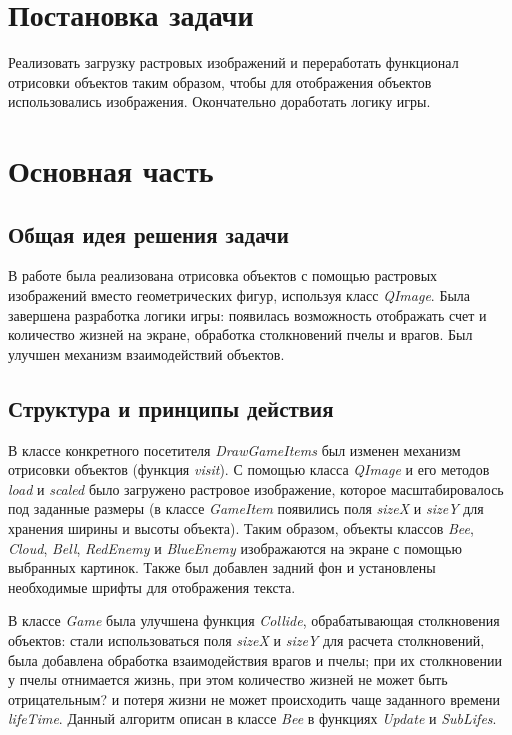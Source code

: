 \documentclass[a4paper,14pt]{article}
\begin{document}

\setcounter{page}{2} %

\renewcommand\contentsname{\centering {\normalsize Содержание}}
\tableofcontents
\newpage

\section*{Постановка задачи}

Реализовать загрузку растровых изображений и переработать функционал отрисовки объектов таким образом, чтобы для отображения объектов использовались изображения. Окончательно доработать логику игры.


\newpage

\section{Основная часть}
\subsection{Общая идея решения задачи}
В работе была реализована отрисовка объектов с помощью растровых изображений вместо геометрических фигур, используя класс \textit{QImage}. Была завершена разработка логики игры: появилась возможность отображать счет и количество жизней на экране, обработка столкновений пчелы и врагов. Был улучшен механизм взаимодействий объектов.

\subsection{Структура и принципы действия}
В классе конкретного посетителя \textit{DrawGameItems} был изменен механизм отрисовки объектов (функция \textit{visit}). С помощью класса \textit{QImage} и его методов \textit{load} и \textit{scaled} было загружено растровое изображение, которое масштабировалось под заданные размеры (в классе \textit{GameItem} появились поля \textit{sizeX} и \textit{sizeY} для хранения ширины и высоты объекта). Таким образом, объекты классов \textit{Bee}, \textit{Cloud}, \textit{Bell}, \textit{RedEnemy} и \textit{BlueEnemy} изображаются на экране с помощью выбранных картинок. Также был добавлен задний фон и установлены необходимые шрифты для отображения текста.

В классе \textit{Game} была улучшена функция \textit{Collide}, обрабатывающая столкновения объектов: стали использоваться поля \textit{sizeX} и \textit{sizeY} для расчета столкновений, была добавлена обработка взаимодействия врагов и пчелы; при их столкновении у пчелы отнимается жизнь, при этом количество жизней не может быть отрицательным? и потеря жизни не может происходить чаще заданного времени \textit{lifeTime}. Данный алгоритм описан в классе \textit{Bee} в функциях \textit{Update} и \textit{SubLifes}.
\end{document}
